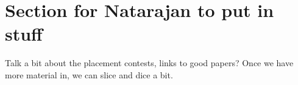 \section{Section for Natarajan to put in stuff}

Talk a bit about the placement contests, links to good papers?
Once we have more material in, we can slice and dice a bit.

